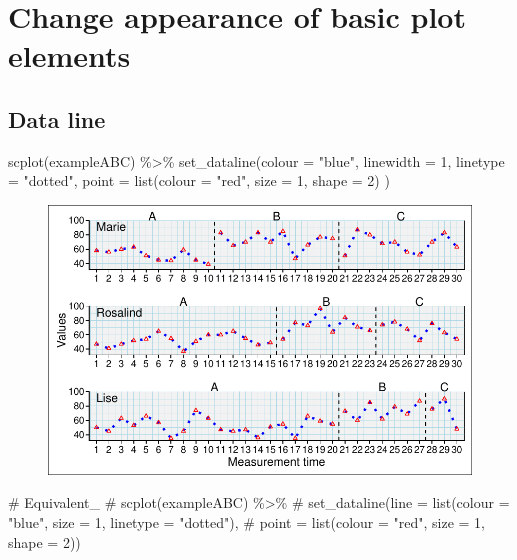\documentclass[
  letterpaper,
  DIV=11,
  numbers=noendperiod]{scrreprt}
\newenvironment{Shaded}{\begin{snugshade}}{\end{snugshade}}
\newcommand{\AttributeTok}[1]{\textcolor[rgb]{0.40,0.45,0.13}{#1}}
\newcommand{\CommentTok}[1]{\textcolor[rgb]{0.37,0.37,0.37}{#1}}
\newcommand{\DecValTok}[1]{\textcolor[rgb]{0.68,0.00,0.00}{#1}}
\newcommand{\FunctionTok}[1]{\textcolor[rgb]{0.28,0.35,0.67}{#1}}
\newcommand{\NormalTok}[1]{\textcolor[rgb]{0.00,0.23,0.31}{#1}}
\newcommand{\SpecialCharTok}[1]{\textcolor[rgb]{0.37,0.37,0.37}{#1}}
\newcommand{\StringTok}[1]{\textcolor[rgb]{0.13,0.47,0.30}{#1}}
\begin{document}
\hypertarget{change-appearance-of-basic-plot-elements}{%
\section{Change appearance of basic plot
elements}\label{change-appearance-of-basic-plot-elements}}

\hypertarget{data-line}{%
\subsection{Data line}\label{data-line}}

\begin{Shaded}
\begin{Highlighting}[]
\FunctionTok{scplot}\NormalTok{(exampleABC) }\SpecialCharTok{\%\textgreater{}\%}
  \FunctionTok{set\_dataline}\NormalTok{(}\AttributeTok{colour =} \StringTok{"blue"}\NormalTok{, }\AttributeTok{linewidth =} \DecValTok{1}\NormalTok{, }\AttributeTok{linetype =} \StringTok{"dotted"}\NormalTok{, }
               \AttributeTok{point =} \FunctionTok{list}\NormalTok{(}\AttributeTok{colour =} \StringTok{"red"}\NormalTok{, }\AttributeTok{size =} \DecValTok{1}\NormalTok{, }\AttributeTok{shape =} \DecValTok{2}\NormalTok{) )}
\end{Highlighting}
\end{Shaded}

\begin{figure}[H]

{\centering \includegraphics{./ch_scplot_files/figure-pdf/line1-1.pdf}

}

\end{figure}

\begin{Shaded}
\begin{Highlighting}[]
\CommentTok{\# Equivalent\_}
\CommentTok{\# scplot(exampleABC) \%\textgreater{}\%}
\CommentTok{\#   set\_dataline(line = list(colour = "blue", size = 1, linetype = "dotted"), }
\CommentTok{\#                point = list(colour = "red", size = 1, shape = 2)) }
\end{Highlighting}
\end{Shaded}
\end{document}
